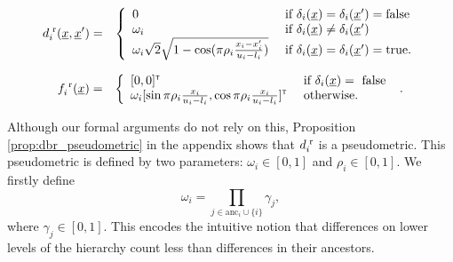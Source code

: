 \documentclass[letterpaper]{article}
\newcommand{\vect}[1]{\underline{\smash{#1}}}
\renewcommand{\v}[1]{\vect{#1}}
\newcommand{\br}{^{\text{\textnormal{ r}}}}
\newcommand\transpose{{\textrm{\tiny{\sf{T}}}}}
\begin{document}
\begin{eqnarray}
\nonumber{}d\br_i(\v{x}, \v{x}') & = & \left\{\begin{array}{ll}
\nonumber{} 0 & \textrm{ if } \delta_i(\v{x}) = \delta_i(\v{x}') = \textrm{false}\\
\nonumber{} \omega_i & \textrm{ if } \delta_i(\v{x}) \neq \delta_i(\v{x}')\\
\nonumber{} \omega_i \sqrt{2} \sqrt{1 - \cos(\pi\rho_i \frac{x_i-x_i'}{u_i-l_i})} & \textrm{ if } \delta_i(\v{x}) = \delta_i(\v{x}') = \textrm{true}. \end{array}\right.
\end{eqnarray}

\begin{eqnarray}
\nonumber{}f_i\br(\v{x}) & = & \left\{\begin{array}{ll}
[0,0]^\transpose & \textrm{ if } \delta_i(\v{x}) = \textrm{ false }\\
\nonumber{} \omega_i [\sin{\pi\rho_i\frac{x_i}{u_i-l_i}}, \cos{\pi\rho_i\frac{x_i}{u_i-l_i}}]^\transpose & \textrm{ otherwise.}\end{array}\right..
\end{eqnarray}

Although our formal arguments do not rely on this, Proposition \ref{prop:dbr_pseudometric} in the appendix shows that $d\br_i$ is a pseudometric. 
This pseudometric is defined by two parameters: $\omega_i \in [0,1]$ and $\rho_i \in [0,1]$. We firstly define 
\begin{equation}\label{eq:gamma}
\omega_i = \prod_{j \in \text{anc}_i \cup \{i\}} \gamma_j, 
\end{equation}
where $\gamma_j \in [0,1]$. This encodes the intuitive notion that differences on lower levels of the hierarchy count less than differences in their ancestors.
\end{document}
